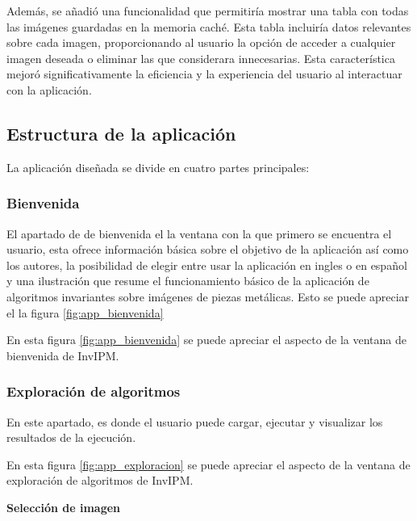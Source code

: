 Además, se añadió una funcionalidad que permitiría mostrar una tabla con todas las imágenes guardadas en la memoria caché. Esta tabla incluiría datos relevantes sobre cada imagen, proporcionando al usuario la opción de acceder a cualquier imagen deseada o eliminar las que considerara innecesarias. Esta característica mejoró significativamente la eficiencia y la experiencia del usuario al interactuar con la aplicación.

\subsection{Estructura de la aplicación}\label{estructura-de-la-aplicación}

La aplicación diseñada se divide en cuatro partes principales:

\subsubsection{Bienvenida}\label{bienvenida}

El apartado de de bienvenida el la ventana con la que primero se encuentra el usuario, esta ofrece información básica sobre el objetivo de la aplicación así como los autores, la posibilidad de elegir entre usar la aplicación en ingles o en español y una ilustración que resume el funcionamiento básico de la aplicación de algoritmos invariantes sobre imágenes de piezas metálicas. Esto se puede apreciar el la figura \ref{fig:app_bienvenida}


En esta figura \ref{fig:app_bienvenida} se puede apreciar el aspecto de la ventana de bienvenida de InvIPM.

\subsubsection{Exploración de algoritmos}\label{exploración-de-algoritmos}

En este apartado, es donde el usuario puede cargar, ejecutar y visualizar los resultados de la ejecución.


En esta figura \ref{fig:app_exploracion} se puede apreciar el aspecto de la ventana de exploración de algoritmos de InvIPM.

\textbf{Selección de imagen}\label{selección-de-imagen}


